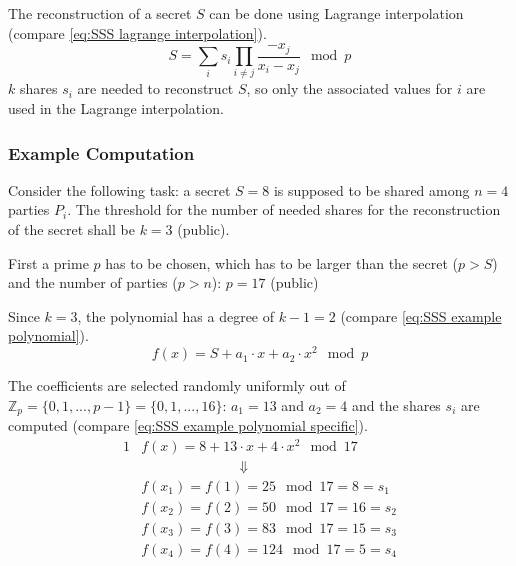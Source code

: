 				
		The reconstruction of a secret $S$ can be done using Lagrange interpolation (compare \ref{eq:SSS lagrange interpolation}).
		\begin{equation}
		\label{eq:SSS lagrange interpolation}
		S = \sum_i s_i \prod_{i \neq j} \frac{-x_j}{x_i-x_j} \mod p
		\end{equation}
		 $k$ shares $s_i$ are needed to reconstruct $S$, so only the associated values for $i$ are used in the Lagrange interpolation.
						
		\subsubsection{Example Computation}
		
		Consider the following task: a secret $S=8$ is supposed to be shared among $n=4$ parties $P_i$. The threshold for the number of needed shares for the reconstruction of the secret shall be $k=3$ (public).
		
		First a prime $p$ has to be chosen, which has to be larger than the secret ($p>S$) and the number of parties ($p>n$): $p=17$ (public)
		
		Since $k=3$, the polynomial has a degree of $k-1=2$ (compare \ref{eq:SSS example polynomial}).
		\begin{equation}
		\label{eq:SSS example polynomial}
		f(x) = S + a_1 \cdot x + a_2 \cdot x^2 \mod p
		\end{equation}
		 
		 The coefficients are selected randomly uniformly out of $\mathbb{Z}_p=\{0,1,...,p-1\}=\{0,1,...,16\}$: $a_1=13$ and $a_2=4$ and the shares $s_i$ are computed (compare \ref{eq:SSS example polynomial specific}).
		 \begin{alignat}{1}
		 & f(x) = 8 + 13 \cdot x + 4 \cdot x^2 \mod 17 \label{eq:SSS example polynomial specific} \\
		 &\qquad \qquad \qquad \quad \Downarrow \nonumber \\ 
		 & f(x_1)=f(1)=25\mod17=8=s_1 \nonumber \\
		 & f(x_2)=f(2)=50\mod17=16=s_2 \nonumber \\
		 & f(x_3)=f(3)=83\mod17=15=s_3 \nonumber \\
		 & f(x_4)=f(4)=124\mod17=5=s_4 \nonumber 
		 \end{alignat}
		 
